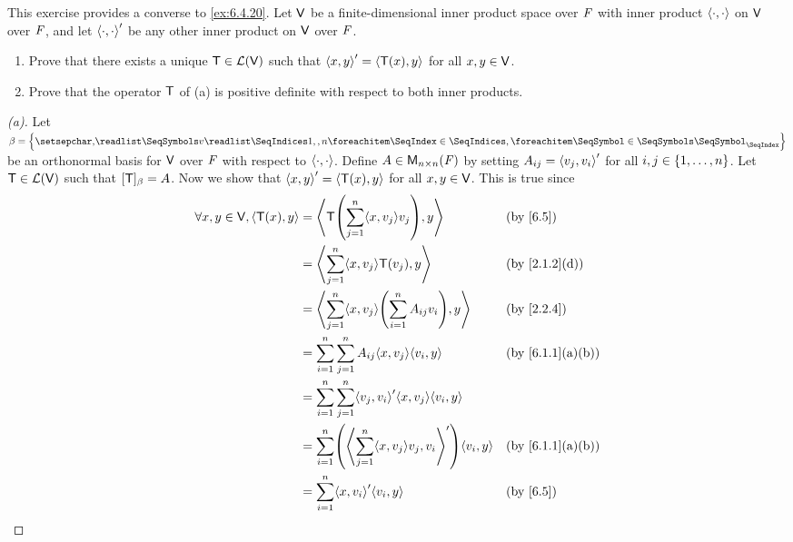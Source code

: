 \begin{ex}\label{ex:6.4.22}
  This exercise provides a converse to \cref{ex:6.4.20}.
  Let \(\mathsf{V}\) be a finite-dimensional inner product space over \(\mathit{F}\) with inner product \(\left\langle\cdot, \cdot\right\rangle\) on \(\mathsf{V}\) over \(\mathit{F}\), and let \(\left\langle\cdot, \cdot\right\rangle'\) be any other inner product on \(\mathsf{V}\) over \(\mathit{F}\).
  \begin{enumerate}
    \item Prove that there exists a unique \(\mathsf{T} \in \mathcal{L}(\mathsf{V})\) such that \(\left\langle x, y\right\rangle' = \left\langle\mathsf{T}(x), y\right\rangle\) for all \(x, y \in \mathsf{V}\).
    \item Prove that the operator \(\mathsf{T}\) of (a) is positive definite with respect to both inner products.
  \end{enumerate}
\end{ex}

\begin{proof}[(a)]
  Let \(\beta = \set{\seq{v}{1,,n}}\) be an orthonormal basis for \(\mathsf{V}\) over \(\mathit{F}\) with respect to \(\left\langle\cdot, \cdot\right\rangle\).
  Define \(A \in \mathsf{M}_{{n} \times n}({\mathit{F}})\) by setting \(A_{i j} = \left\langle v_j, v_i\right\rangle'\) for all \(i, j \in \left\lbrace1, \dots, n\right\rbrace\).
  Let \(\mathsf{T} \in \mathcal{L}(\mathsf{V})\) such that \([\mathsf{T}]_{\beta} = A\).
  Now we show that \(\left\langle x, y\right\rangle' = \left\langle\mathsf{T}(x), y\right\rangle\) for all \(x, y \in \mathsf{V}\).
  This is true since
  \begin{align*}
    \forall x, y \in \V, \inn{\T(x), y} & = \inn{\T\pa{\sum_{j = 1}^n \inn{x, v_j} v_j}, y}                              &  & \text{(by \cref{6.5})}         \\
                                        & = \inn{\sum_{j = 1}^n \inn{x, v_j} \T(v_j), y}                                 &  & \text{(by \cref{2.1.2}(d))}    \\
                                        & = \inn{\sum_{j = 1}^n \inn{x, v_j} \pa{\sum_{i = 1}^n A_{i j} v_i}, y}         &  & \text{(by \cref{2.2.4})}       \\
                                        & = \sum_{i = 1}^n \sum_{j = 1}^n A_{i j} \inn{x, v_j} \inn{v_i, y}              &  & \text{(by \cref{6.1.1}(a)(b))} \\
                                        & = \sum_{i = 1}^n \sum_{j = 1}^n \inn{v_j, v_i}' \inn{x, v_j} \inn{v_i, y}                                          \\
                                        & = \sum_{i = 1}^n \pa{\inn{\sum_{j = 1}^n \inn{x, v_j} v_j, v_i}'} \inn{v_i, y} &  & \text{(by \cref{6.1.1}(a)(b))} \\
                                        & = \sum_{i = 1}^n \inn{x, v_i}' \inn{v_i, y}                                    &  & \text{(by \cref{6.5})}         \\

\end{align*}
\end{proof}
